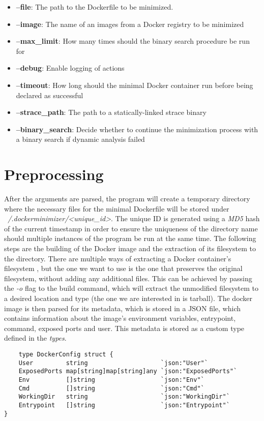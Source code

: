 \begin{itemize}
    \item \textbf{--file}: The path to the Dockerfile to be minimized.
    \item \textbf{--image}: The name of an images from a Docker registry to be minimized
    \item \textbf{--max_limit}: How many times should the binary search procedure be run for
    \item \textbf{--debug}: Enable logging of actions 
    \item \textbf{--timeout}: How long should the minimal Docker container run before being declared as successful
    \item \textbf{--strace_path}: The path to a statically-linked strace binary
    \item \textbf{--binary_search}: Decide whether to continue the minimization process with a binary search if dynamic analysis failed
\end{itemize}

\section{Preprocessing}

After the arguments are parsed, the program will create a temporary directory where the necessary files for the minimal Dockerfile will be stored under 
\textit{~/.dockerminimizer/<unique_id>}. The unique ID is generated using a \textit{MD5} hash of the current timestamp in order to ensure the uniqueness of the directory name should
multiple instances of the program be run at the same time.
The following steps are the building of the Docker image and the extraction of its filesystem to the directory. 
There are multiple ways of extracting a Docker container's filesystem \cite{extract-filesystem}, but the one we want to use is the one that preserves the original filesystem, without
adding any additional files. This can be achieved by passing the \textit{-o} flag to the build command, which will extract the unmodified filesystem to a desired location and type (the one
we are interested in is tarball). 
The docker image is then parsed for its metadata, which is stored in a JSON file, which contains information about the image's environment variables, entrypoint, command, exposed ports and user.
This metadata is stored as a custom type defined in the \textit{types}.

\lstset{language=Go,caption=Go DockerConfig structure,label=lst:metadata-type}
\begin{lstlisting}
    type DockerConfig struct {
	User         string                    `json:"User"`
	ExposedPorts map[string]map[string]any `json:"ExposedPorts"`
	Env          []string                  `json:"Env"`
	Cmd          []string                  `json:"Cmd"`
	WorkingDir   string                    `json:"WorkingDir"`
	Entrypoint   []string                  `json:"Entrypoint"`
}
\end{lstlisting}

